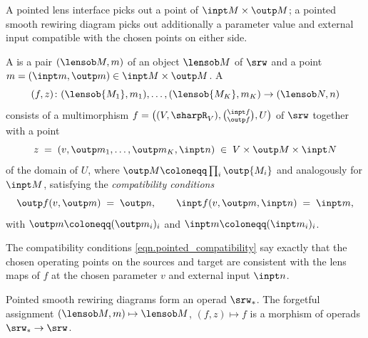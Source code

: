 A pointed lens interface picks out a point of $\inpt M\times\outp M$; a pointed smooth rewiring diagram picks out additionally a parameter value and external input compatible with the chosen points on either side.

\begin{definition}\label{def.srw_pointed}
A  is a pair $(\lensob M,m)$ of an object $\lensob M$ of $\srw$ and a point $m=(\inpt m,\outp m)\in\inpt M\times\outp M$. A 
\[
(f,z)\colon (\lensob{M_1},m_1),\ldots,(\lensob{M_K},m_K)\to(\lensob N,n)
\]
consists of a multimorphism $f=\bigl((V,\sharpR_V),\binom{\inpt f}{\outp f},U\bigr)$ of $\srw$ together with a point
\[
z\;=\;(v,\outp m_1,\ldots,\outp m_K,\inpt n)\;\in\;V\times\outp M\times\inpt N
\]
of the domain of $U$, where $\outp M\coloneqq\prod_i\outp{M_i}$ and analogously for $\inpt M$, satisfying the \emph{compatibility conditions}
\begin{equation}\label{eqn.pointed_compatibility}
\outp f(v,\outp m)\;=\;\outp n,\qquad
\inpt f(v,\outp m,\inpt n)\;=\;\inpt m,
\end{equation}
with $\outp m\coloneqq(\outp m_i)_i$ and $\inpt m\coloneqq(\inpt m_i)_i$.
\end{definition}

The compatibility conditions \eqref{eqn.pointed_compatibility} say exactly that the chosen operating points on the sources and target are consistent with the lens maps of $f$ at the chosen parameter $v$ and external input $\inpt n$.

\begin{proposition}\label{prop.srw_pointed_operad}
Pointed smooth rewiring diagrams form an operad $\srw_*$. The forgetful assignment $(\lensob M,m)\mapsto\lensob M$, $(f,z)\mapsto f$ is a morphism of operads $\srw_*\to\srw$.
\end{proposition}

